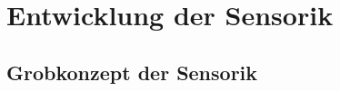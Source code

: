 \chapter{Entwicklung der Sensorik}
\label{chap:entwicklung}


\section{Grobkonzept der Sensorik}
\label{sec:grobkonzept}